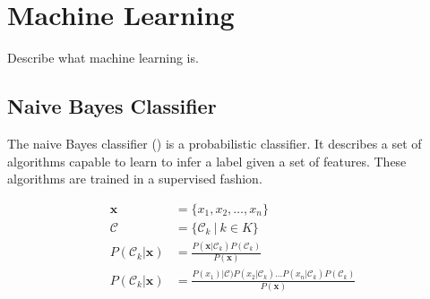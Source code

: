 \section{Machine Learning}
Describe what machine learning is.


\subsection{Naive Bayes Classifier}
The naive Bayes classifier () is a probabilistic classifier. It describes a set
of algorithms capable to learn to infer a label given a set of features. These
algorithms are trained in a supervised fashion.

\begin{align}
\boldsymbol{x} &= \{x_1, x_2, \dots, x_n\} \\
\mathcal{C} &= \{\mathcal{C}_k \: | \: k \in K \} \\
P(\mathcal{C}_k|\boldsymbol{x}) &= \frac{P(\boldsymbol{x} |\mathcal{C}_k) P(\mathcal{C}_k)} {P(\boldsymbol{x})} \\
P(\mathcal{C}_k|\boldsymbol{x}) &= \frac{P(x_1) |\mathcal{C})
                                   P(x_2 |\mathcal{C}_k) \dots
                                   P(x_n |\mathcal{C}_k)
                                   P(\mathcal{C}_k)}{ P(\boldsymbol{x})} \\
\end{align}
